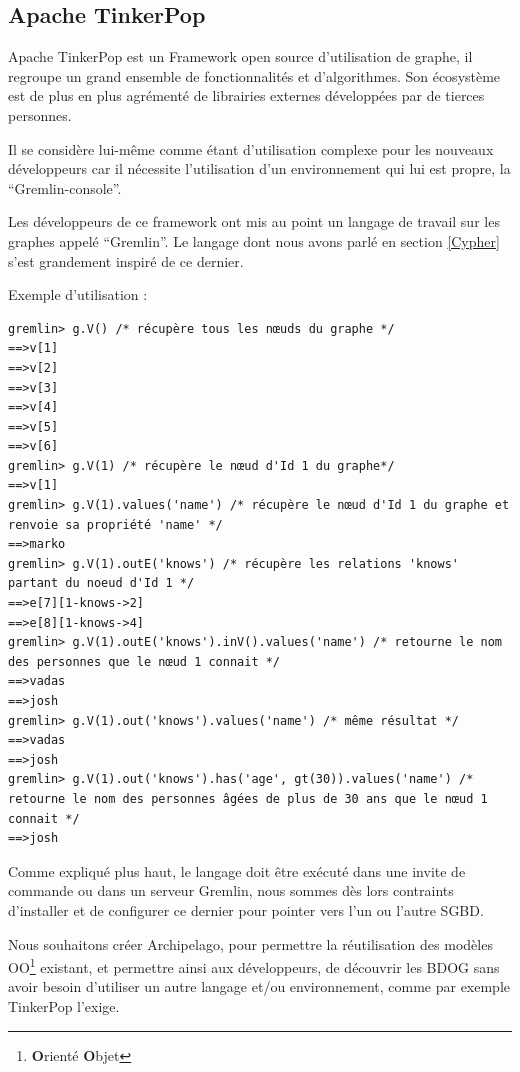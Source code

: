 \documentclass[a4paper,fleqn,12pt,oneside]{report}
\begin{document}
\subsection{Apache TinkerPop}

Apache TinkerPop est un Framework open source d’utilisation de graphe, il regroupe un grand ensemble de fonctionnalités et d’algorithmes. Son écosystème est de plus en plus agrémenté de librairies externes développées par de tierces personnes.

Il se considère lui-même comme étant d’utilisation complexe pour les nouveaux développeurs car il nécessite l’utilisation d’un environnement qui lui est propre, la \enquote{Gremlin-console}.

Les développeurs de ce framework ont mis au point un langage de travail sur les graphes appelé \enquote{Gremlin}. Le langage dont nous avons parlé en section \ref{Cypher} s’est grandement inspiré de ce dernier.\cite{tinkerPopSite}

Exemple d’utilisation :

\begin{lstlisting}
gremlin> g.V() /* récupère tous les nœuds du graphe */
==>v[1]
==>v[2]
==>v[3]
==>v[4]
==>v[5]
==>v[6]
gremlin> g.V(1) /* récupère le nœud d'Id 1 du graphe*/
==>v[1]
gremlin> g.V(1).values('name') /* récupère le nœud d'Id 1 du graphe et renvoie sa propriété 'name' */
==>marko
gremlin> g.V(1).outE('knows') /* récupère les relations 'knows' partant du noeud d'Id 1 */
==>e[7][1-knows->2]
==>e[8][1-knows->4]
gremlin> g.V(1).outE('knows').inV().values('name') /* retourne le nom des personnes que le nœud 1 connait */
==>vadas
==>josh
gremlin> g.V(1).out('knows').values('name') /* même résultat */
==>vadas
==>josh
gremlin> g.V(1).out('knows').has('age', gt(30)).values('name') /* retourne le nom des personnes âgées de plus de 30 ans que le nœud 1 connait */
==>josh
\end{lstlisting}

Comme expliqué plus haut, le langage doit être exécuté dans une invite de commande ou dans un serveur Gremlin, nous sommes dès lors contraints d’installer et de configurer ce dernier pour pointer vers l’un ou l’autre SGBD.

Nous souhaitons créer Archipelago, pour permettre la réutilisation des modèles OO\footnote{\textbf{O}rienté \textbf{O}bjet} existant, et permettre ainsi aux développeurs, de découvrir les BDOG sans avoir besoin d'utiliser un autre langage et/ou environnement, comme par exemple TinkerPop l'exige.
\end{document}
